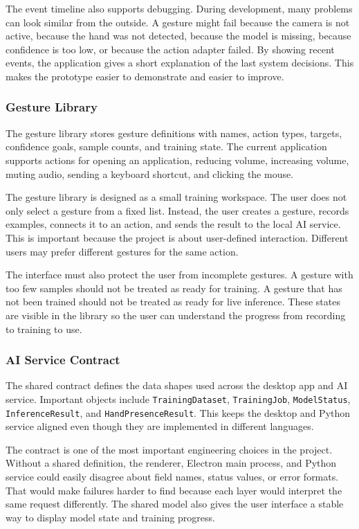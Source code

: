 \documentclass[10pt,twocolumn]{article}
\begin{document}
The event timeline also supports debugging.
During development, many problems can look similar from the outside.
A gesture might fail because the camera is not active, because the hand was not detected, because the model is missing, because confidence is too low, or because the action adapter failed.
By showing recent events, the application gives a short explanation of the last system decisions.
This makes the prototype easier to demonstrate and easier to improve.

\subsubsection{Gesture Library}
The gesture library stores gesture definitions with names, action types, targets, confidence goals, sample counts, and training state.
The current application supports actions for opening an application, reducing volume, increasing volume, muting audio, sending a keyboard shortcut, and clicking the mouse.

The gesture library is designed as a small training workspace.
The user does not only select a gesture from a fixed list.
Instead, the user creates a gesture, records examples, connects it to an action, and sends the result to the local AI service.
This is important because the project is about user-defined interaction.
Different users may prefer different gestures for the same action.

The interface must also protect the user from incomplete gestures.
A gesture with too few samples should not be treated as ready for training.
A gesture that has not been trained should not be treated as ready for live inference.
These states are visible in the library so the user can understand the progress from recording to training to use.

\subsubsection{AI Service Contract}
The shared contract defines the data shapes used across the desktop app and AI service.
Important objects include \texttt{TrainingDataset}, \texttt{TrainingJob}, \texttt{ModelStatus}, \texttt{InferenceResult}, and \texttt{HandPresenceResult}.
This keeps the desktop and Python service aligned even though they are implemented in different languages.

The contract is one of the most important engineering choices in the project.
Without a shared definition, the renderer, Electron main process, and Python service could easily disagree about field names, status values, or error formats.
That would make failures harder to find because each layer would interpret the same request differently.
The shared model also gives the user interface a stable way to display model state and training progress.
\end{document}
